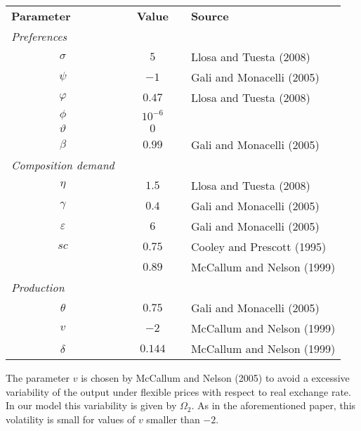\documentclass{article}
\begin{document}
\begin{center}
\begin{tabular}{|lllll|}
\hline
\textbf{Parameter} &  & \textbf{Value} &  & \textbf{Source} \\ 
\cline{1-1}\cline{3-3}\cline{5-5}
\textit{Preferences} &  &  &  &  \\ 
\multicolumn{1}{|c}{$\sigma $} &  & \multicolumn{1}{c}{$5$} &  & Llosa and
Tuesta (2008) \\ 
\multicolumn{1}{|c}{$\psi $} &  & \multicolumn{1}{c}{$-1$} &  & Gali and
Monacelli (2005) \\ 
\multicolumn{1}{|c}{$\varphi $} &  & \multicolumn{1}{c}{$0.47$} &  & Llosa
and Tuesta (2008) \\ 
\multicolumn{1}{|c}{$\phi $} &  & \multicolumn{1}{c}{$10^{-6}$} &  &  \\ 
\multicolumn{1}{|c}{$\vartheta $} &  & \multicolumn{1}{c}{$0$} &  &  \\ 
\multicolumn{1}{|c}{$\beta $} &  & \multicolumn{1}{c}{$0.99$} &  & Gali and
Monacelli (2005) \\ 
\textit{Composition demand} &  & \multicolumn{1}{c}{} &  &  \\ 
\multicolumn{1}{|c}{$\eta $} &  & \multicolumn{1}{c}{$1.5$} &  & Llosa and
Tuesta (2008) \\ 
\multicolumn{1}{|c}{$\gamma $} &  & \multicolumn{1}{c}{$0.4$} &  & Gali and
Monacelli (2005) \\ 
\multicolumn{1}{|c}{$\varepsilon $} &  & \multicolumn{1}{c}{$6$} &  & Gali
and Monacelli (2005) \\ 
\multicolumn{1}{|c}{$sc$} &  & \multicolumn{1}{c}{$0.75$} &  & Cooley and
Prescott (1995) \\ 
&  & \multicolumn{1}{c}{$0.89$} &  & McCallum and Nelson (1999) \\ 
\textit{Production} &  & \multicolumn{1}{c}{} &  &  \\ 
\multicolumn{1}{|c}{$\theta $} &  & \multicolumn{1}{c}{$0.75$} &  & Gali and
Monacelli (2005) \\ 
\multicolumn{1}{|c}{$v$} &  & \multicolumn{1}{c}{$-2$} &  & McCallum and
Nelson (1999) \\ 
\multicolumn{1}{|c}{$\delta $} &  & \multicolumn{1}{c}{$0.144$} &  & 
McCallum and Nelson (1999) \\ \hline
\end{tabular}
\end{center}

The parameter $v$ is chosen by McCallum and Nelson (2005) to avoid a
excessive variability of the output under flexible prices with respect to
real exchange rate. In our model this variability is given by $\Omega _{2}.$
As in the aforementioned paper, this volatility is small for values of $v$
smaller than $-2.$
\end{document}
